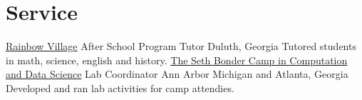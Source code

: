 \section{Service}
        {\href{www.rainbowvillage.org}{Rainbow Village}}
        {After School Program Tutor}
        {Duluth, Georgia}{}
        {Tutored students in math, science, english and history.}
		{\href{https://pwp.gatech.edu/seth-bonder-camp/}{The Seth Bonder Camp in Computation and Data Science}}
		{Lab Coordinator}
		{Ann Arbor Michigan and Atlanta, Georgia}{}
        {Developed and ran lab activities for camp attendies.}
